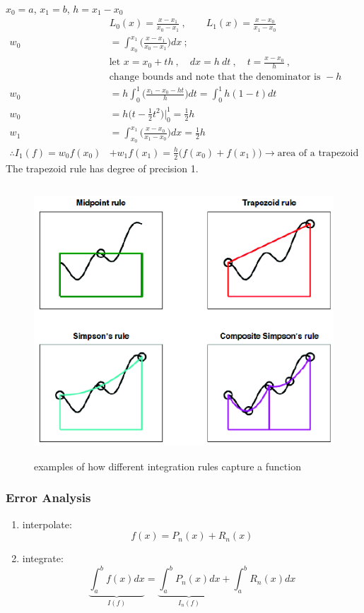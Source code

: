 \documentclass[12pt]{article}
\begin{document}
$x_0 = a$, $x_1 = b$, $h = x_1 - x_0$
%
\begin{align*}
&L_0(x) = \frac{x-x_1}{x_0-x_1}\:, \qquad L_1(x) = \frac{x-x_0}{x_1-x_0} \\
%
w_0 &= \int_{x_0}^{x_1} \bigl(\frac{x-x_1}{x_0-x_1}\bigr) dx\:; 
\\ &\text{let } x = x_0 + th  \:, \quad dx = h\:dt\:, \quad t = \frac{x-x_0}{h}\:,\\
&\text{change bounds and note that the denominator is }-h \\
%
w_0 &= h \int_0^1 \bigl(\frac{x_1 - x_0 - ht}{h}\bigr)dt = \int_0^1 h(1-t)dt \\
%
w_0 &= h\bigl(t - \frac{1}{2}t^2 \bigr) |_0^1 = \frac{1}{2}h\\
%
w_1 &= \int_{x_0}^{x_1} \bigl(\frac{x-x_0}{x_1-x_0}\bigr) dx = \frac{1}{2}h\\
%
\therefore I_1(f) = w_0f(x_0) &+ w_1f(x_1)  = \boxed{\frac{h}{2}\bigl(f(x_0) + f(x_1)\bigr)} \rightarrow \text{area of a trapezoid}
\end{align*}
%
The trapezoid rule has degree of precision 1.

\begin{figure}
\begin{center}
  \includegraphics[height=4in,clip]{../figs/QuadratureComparison}
\end{center}
\caption{examples of how different integration rules capture a function}
\end{figure}

\subsubsection*{Error Analysis}
\begin{enumerate}
\item interpolate:
\[f(x) = P_n(x) + R_n(x)\]
\item integrate:
\[\underbrace{\int_a^b f(x) dx}_{I(f)} = \underbrace{\int_a^b P_n(x)dx}_{I_n(f)} + \int_a^b R_n(x) dx\]
\end{enumerate}
\end{document}
